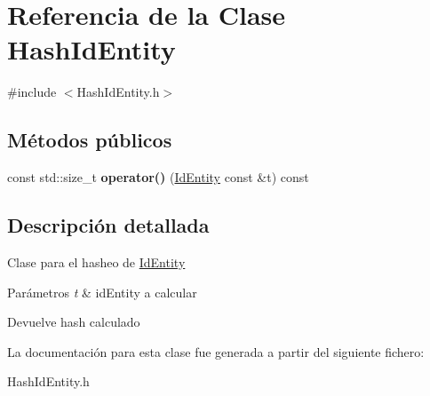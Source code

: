\hypertarget{classHashIdEntity}{}\section{Referencia de la Clase Hash\+Id\+Entity}
\label{classHashIdEntity}


{\ttfamily \#include $<$Hash\+Id\+Entity.\+h$>$}

\subsection*{Métodos públicos}
\begin{DoxyCompactItemize}
\item 
\hypertarget{classHashIdEntity_a157853f9e3cc6a44eeb5f323a6abd342}{}const std\+::size\+\_\+t {\bfseries operator()} (\hyperlink{classIdEntity}{Id\+Entity} const \&t) const \label{classHashIdEntity_a157853f9e3cc6a44eeb5f323a6abd342}

\end{DoxyCompactItemize}


\subsection{Descripción detallada}
Clase para el hasheo de \hyperlink{classIdEntity}{Id\+Entity} 
\begin{DoxyParams}{Parámetros}
{\em t} & id\+Entity a calcular \\
\hline
\end{DoxyParams}
\begin{DoxyReturn}{Devuelve}
hash calculado 
\end{DoxyReturn}


La documentación para esta clase fue generada a partir del siguiente fichero\+:\begin{DoxyCompactItemize}
\item 
Hash\+Id\+Entity.\+h\end{DoxyCompactItemize}
